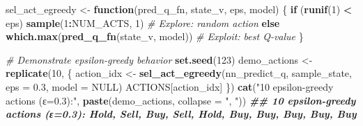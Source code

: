 \documentclass[
]{article}
\newenvironment{Shaded}{\begin{snugshade}}{\end{snugshade}}
\newcommand{\AttributeTok}[1]{\textcolor[rgb]{0.13,0.29,0.53}{#1}}
\newcommand{\CommentTok}[1]{\textcolor[rgb]{0.56,0.35,0.01}{\textit{#1}}}
\newcommand{\ConstantTok}[1]{\textcolor[rgb]{0.56,0.35,0.01}{#1}}
\newcommand{\ControlFlowTok}[1]{\textcolor[rgb]{0.13,0.29,0.53}{\textbf{#1}}}
\newcommand{\DecValTok}[1]{\textcolor[rgb]{0.00,0.00,0.81}{#1}}
\newcommand{\DocumentationTok}[1]{\textcolor[rgb]{0.56,0.35,0.01}{\textbf{\textit{#1}}}}
\newcommand{\FloatTok}[1]{\textcolor[rgb]{0.00,0.00,0.81}{#1}}
\newcommand{\FunctionTok}[1]{\textcolor[rgb]{0.13,0.29,0.53}{\textbf{#1}}}
\newcommand{\NormalTok}[1]{#1}
\newcommand{\OtherTok}[1]{\textcolor[rgb]{0.56,0.35,0.01}{#1}}
\newcommand{\SpecialCharTok}[1]{\textcolor[rgb]{0.81,0.36,0.00}{\textbf{#1}}}
\newcommand{\StringTok}[1]{\textcolor[rgb]{0.31,0.60,0.02}{#1}}
\begin{document}
\begin{Shaded}
\begin{Highlighting}[]
\NormalTok{sel\_act\_egreedy }\OtherTok{\textless{}{-}} \ControlFlowTok{function}\NormalTok{(pred\_q\_fn, state\_v, eps, model) \{}
  \ControlFlowTok{if}\NormalTok{ (}\FunctionTok{runif}\NormalTok{(}\DecValTok{1}\NormalTok{) }\SpecialCharTok{\textless{}}\NormalTok{ eps) }\FunctionTok{sample}\NormalTok{(}\DecValTok{1}\SpecialCharTok{:}\NormalTok{NUM\_ACTS, }\DecValTok{1}\NormalTok{)  }\CommentTok{\# Explore: random action}
  \ControlFlowTok{else} \FunctionTok{which.max}\NormalTok{(}\FunctionTok{pred\_q\_fn}\NormalTok{(state\_v, model))   }\CommentTok{\# Exploit: best Q{-}value}
\NormalTok{\}}

\CommentTok{\# Demonstrate epsilon{-}greedy behavior}
\FunctionTok{set.seed}\NormalTok{(}\DecValTok{123}\NormalTok{)}
\NormalTok{demo\_actions }\OtherTok{\textless{}{-}} \FunctionTok{replicate}\NormalTok{(}\DecValTok{10}\NormalTok{, \{}
\NormalTok{  action\_idx }\OtherTok{\textless{}{-}} \FunctionTok{sel\_act\_egreedy}\NormalTok{(nn\_predict\_q, sample\_state, }\AttributeTok{eps =} \FloatTok{0.3}\NormalTok{, }\AttributeTok{model =} \ConstantTok{NULL}\NormalTok{)}
\NormalTok{  ACTIONS[action\_idx]}
\NormalTok{\})}
\FunctionTok{cat}\NormalTok{(}\StringTok{"10 epsilon{-}greedy actions (ε=0.3):"}\NormalTok{, }\FunctionTok{paste}\NormalTok{(demo\_actions, }\AttributeTok{collapse =} \StringTok{", "}\NormalTok{))}
\DocumentationTok{\#\# 10 epsilon{-}greedy actions (ε=0.3): Hold, Sell, Buy, Sell, Hold, Buy, Buy, Buy, Buy, Buy}
\end{Highlighting}
\end{Shaded}
\end{document}
